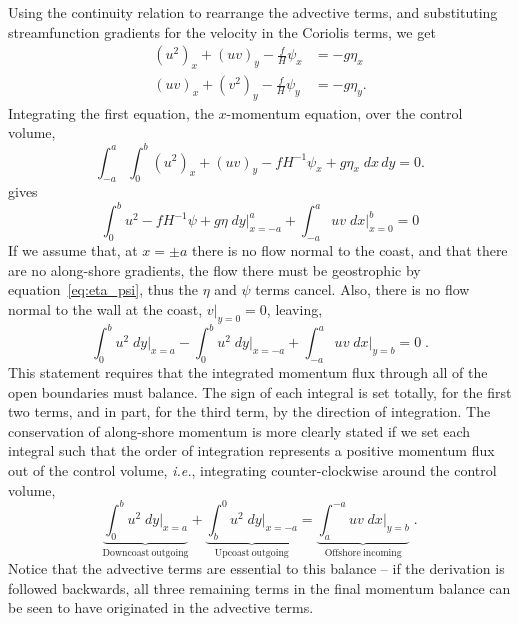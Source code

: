 \documentclass[11pt]{report}
\numberwithin{equation}{section}
\begin{document}
Using the continuity relation to rearrange the advective terms, and substituting streamfunction gradients for the velocity in the Coriolis terms, we get
\begin{align}
    (u^2)_x + (u v)_y - \frac{f}{H} \psi_x &= -g \eta_x \\
    (u v)_x + (v^2)_y - \frac{f}{H} \psi_y &= -g \eta_y.
\end{align}
Integrating the first equation, the $x$-momentum equation, over the control volume,
\begin{equation}
    \int_{-a}^a \int_0^b (u^2)_x + (u v)_y - f H^{-1} \psi_x + g \eta_x\;dx\,dy = 0.
\end{equation}
gives
\begin{equation}
    \int_0^b u^2 - f H^{-1} \psi + g \eta\;dy \bigg|_{x=-a}^a + \int_{-a}^{a} u v\;dx \bigg|_{x=0}^b = 0
\end{equation}
If we assume that, at $x=\pm a$ there is no flow normal to the coast, and that there are no along-shore gradients, the flow there must be geostrophic by equation~\ref{eq:eta_psi}, thus the $\eta$ and $\psi$ terms cancel.  Also, there is no flow normal to the wall at the coast, $v|_{y=0} = 0$, leaving,
\begin{equation}
    \int_0^b u^2 \;dy \bigg|_{x=a} 
        - \int_0^b u^2\;dy \bigg|_{x=-a}
        + \int_{-a}^{a} u v\;dx \bigg|_{y=b} = 0 \; .
\end{equation}
This statement requires that the integrated momentum flux through all of the open boundaries must balance.  The sign of each integral is set totally, for the first two terms, and in part, for the third term, by the direction of integration.  The conservation of along-shore momentum is more clearly stated if we set each integral such that the order of integration represents a positive momentum flux out of the control volume, \emph{i.e.}, integrating counter-clockwise around the control volume,
\begin{equation}
    \underbrace{\int_0^b u^2 \;dy \bigg|_{x=a}}_{\mathrm{Downcoast~outgoing}}
        + \underbrace{\int_b^0 u^2\;dy \bigg|_{x=-a}}_{\mathrm{Upcoast~outgoing}}
        = \underbrace{\int_{a}^{-a} u v\;dx \bigg|_{y=b}}_{\mathrm{Offshore~incoming}} \; .
\end{equation}
Notice that the advective terms are essential to this balance -- if the derivation is followed backwards, all three remaining terms in the final momentum balance can be seen to have originated in the advective terms.
\end{document}
